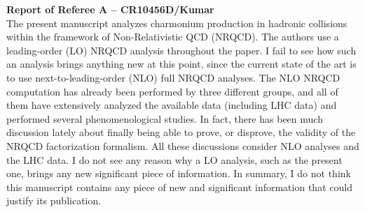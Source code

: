 \documentclass[aps,prc,preprint,superscriptaddress,showpacs,showkeys,amsmath]{revtex4-1}
\begin{document}

{\bf Report of Referee A -- CR10456D/Kumar } \\


The present manuscript analyzes charmonium production in hadronic collisions
within the framework of Non-Relativistic QCD (NRQCD). The authors use a
leading-order (LO) NRQCD analysis throughout the paper. I fail to see how such
an analysis brings anything new at this point, since the current state of the
art is to use next-to-leading-order (NLO) full NRQCD analyses. The NLO NRQCD
computation has already been performed by three different groups, and all of
them have extensively analyzed the available data (including LHC data) and
performed several phenomenological studies. In fact, there has been much
discussion lately about finally being able to prove, or disprove, the validity
of the NRQCD factorization formalism. All these discussions consider NLO
analyses and the LHC data. I do not see any reason why a LO analysis, such as
the present one, brings any new significant piece of information. In summary, I
do not think this manuscript contains any piece of new and significant
information that could justify its publication.\\
\end{document}
